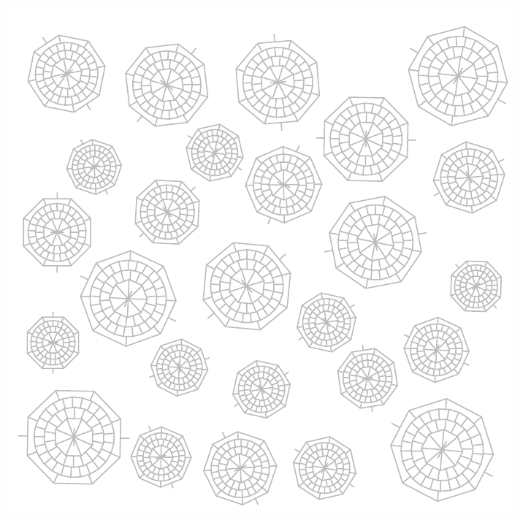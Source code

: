 \begin{titlepage}
	\begin{addmargin}[-1cm]{-3cm}
    \begin{flushleft}

        \hfill

        \vfill


        \begingroup
          \Large
          \color{RoyalPurple}\spacedallcaps{\myTitle} \\ \medskip
        \endgroup

        \begin{large}
          \mySubtitle \\ \bigskip
        \end{large}

        \bigskip
        \bigskip

        \emph{\myVersion} \\ \bigskip

        \bigskip
        \bigskip

        \begin{Large}
          \spacedlowsmallcaps{\myName}
        \end{Large}


        \vfill

        \includegraphics[]{figures/eu_snowflake/eu_snowflake_fall.pdf}


\end{flushleft}
\end{addmargin}
\end{titlepage}
